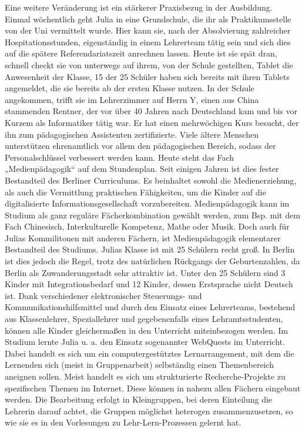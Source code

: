\documentclass[12pt,a4paper]{article}
\begin{document}
\begin{appendix}
Eine weitere Veränderung ist ein stärkerer Praxisbezug in der Ausbildung. Einmal wöchentlich geht Julia in eine Grundschule, die ihr als Praktikumsstelle von der Uni vermittelt wurde. Hier kann sie, nach der Absolvierung zahlreicher Hospitationsstunden, eigenständig in einem Lehrerteam tätig sein und sich dies auf die spätere Referendariatszeit anrechnen lassen.
Heute ist sie spät dran, schnell checkt sie von unterwegs auf ihrem, von der Schule gestellten, Tablet die Anwesenheit der Klasse, 15 der 25 Schüler haben sich bereits mit ihren Tablets angemeldet, die sie bereits ab der ersten Klasse nutzen.
In der Schule angekommen, trifft sie im Lehrerzimmer auf Herrn Y, einen  aus China stammenden Rentner, der vor über 40 Jahren nach Deutschland kam und bis vor Kurzem als Informatiker tätig war. Er hat einen mehrwöchigen Kurs besucht, der ihn zum pädagogischen Assistenten zertifizierte. Viele ältere Menschen unterstützen ehrenamtlich vor allem den pädagogischen Bereich, sodass der Personalschlüssel verbessert werden kann.
Heute steht das Fach „Medienpädagogik“ auf dem Stundenplan. Seit einigen Jahren ist dies fester Bestandteil des Berliner Curriculums. Es beinhaltet sowohl die Medienerziehung, als auch die Vermittlung praktischen Fähigkeiten, um die Kinder auf die digitalisierte Informationsgesellschaft vorzubereiten. Medienpädagogik kann im Studium als ganz reguläre Fächerkombination gewählt werden, zum Bsp. mit dem Fach Chinesisch, Interkulturelle Kompetenz, Mathe oder Musik.
Doch auch für Julias Kommilitonen mit anderen Fächern, ist Medienpädagogik elementarer Bestandteil des Studiums.
Julias Klasse ist mit 25 Schülern recht groß. In Berlin ist dies jedoch die Regel, trotz des natürlichen Rückgangs der Geburtenzahlen, da Berlin als Zuwanderungsstadt sehr attraktiv ist. Unter den 25 Schülern sind 3 Kinder mit Integrationsbedarf und 12 Kinder, dessen Erstsprache nicht Deutsch ist. Dank verschiedener elektronischer Steuerungs- und Kommunikationshilfsmittel und durch den Einsatz eines Lehrerteams, bestehend aus Klassenlehrer, Speziallehrer und gegebenenfalls eines Lehramtsstudenten, können alle Kinder gleichermaßen in den Unterricht miteinbezogen werden.
Im Studium lernte Julia u. a. den Einsatz sogenannter WebQuests im Unterricht. Dabei handelt es sich um ein computergestütztes Lernarrangement, mit dem die Lernenden sich (meist in Gruppenarbeit) selbständig einen Themenbereich aneignen sollen. Meist handelt es sich um strukturierte Recherche-Projekte zu spezifischen Themen im Internet. Diese können in nahezu allen Fächern eingebaut werden. Die Bearbeitung erfolgt in Kleingruppen, bei deren Einteilung die Lehrerin darauf achtet, die Gruppen möglichst heterogen zusammenzusetzen, so wie sie es in den Vorlesungen zu Lehr-Lern-Prozessen gelernt hat.

\end{appendix}
\end{document}
